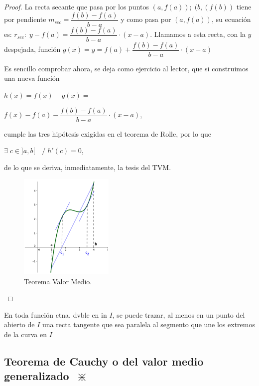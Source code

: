 	\begin{proof}
		La recta secante que pasa por los puntos  $(a,f(a)); \; (b,(f(b))$ tiene por pendiente $m_{sec}=\dfrac {f(b)-f(a)}{b-a}$ y como pasa por $(a,f(a))$, su ecuación es: $r_{sec}:\; y-f(a)= \dfrac {f(b)-f(a)}{b-a} \cdot (x-a)$. Llamamos a esta recta, con la $y$ despejada, función $g(x)=y=f(a)+ \dfrac {f(b)-f(a)}{b-a} \cdot (x-a)$
		
		
		\begin{multicols}{2} 
		
		Es sencillo comprobar ahora, se deja como ejercicio al lector, que si construimos una nueva función 
		
		$h(x)=f(x)-g(x)=$
		
		$f(x)-f(a)- \dfrac {f(b)-f(a)}{b-a} \cdot (x-a)$, 
		
		cumple las tres hipótesis exigidas en el teorema de Rolle, por lo que 
		
		$\exists \; c\in]a,b[ \quad / \; h'(c)=0$, 
		
		de lo que se deriva, inmediatamente, la tesis del TVM.
		
		\begin{figure}[H]
		\centering
		\includegraphics[width=0.4\textwidth]{imagenes/imagenes05/T05IM28.png}
		\caption {Teorema Valor Medio.}
		\end{figure}
		\end{multicols}
		
		\end{proof}
		
		\vspace{-3mm}
		
		En toda función ctna. dvble en in $I$, se puede trazar, al menos en un punto del abierto de $I$ una recta tangente que sea paralela al segmento que une los extremos de la curva en $I$
	
	\subsection{Teorema de Cauchy o del valor medio generalizado $\; \divideontimes$}
	
